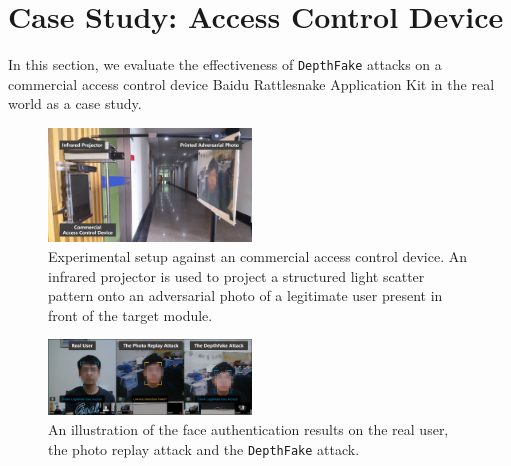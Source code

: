 \section{Case Study: Access Control Device}
In this section, we evaluate the effectiveness of \texttt{DepthFake} attacks on a commercial access control device Baidu Rattlesnake Application Kit in the real world as a case study.

\begin{figure}[pt]
	\centerline{\includegraphics[width = 0.48\textwidth]{figures/commercial_setup.png}}
	\caption{Experimental setup against an commercial access control device. An infrared projector is used to project a structured light scatter pattern onto an adversarial photo of a legitimate user present in front of the target module.}
	\label{setup_2}
\end{figure}
\begin{figure}[pt]
	\centerline{\includegraphics[width = 0.48\textwidth]{figures/commercial_compare.png}}
	\caption{An illustration of the face authentication results on the real user, the photo replay attack and the \texttt{DepthFake} attack.}
	\vspace{-0.15in}
	\label{compare}
\end{figure}

